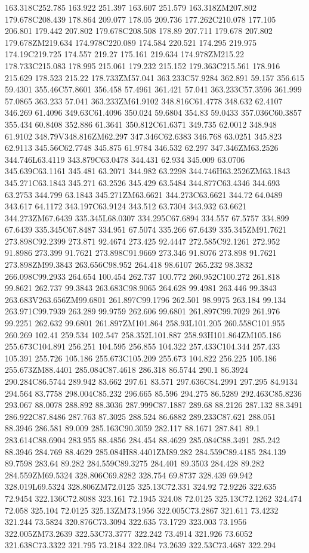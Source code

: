 163.318C252.785 163.922 251.397 163.607 251.579 163.318ZM207.802 179.678C208.439 178.864 209.077 178.05 209.736 177.262C210.078 177.105 206.801 179.442 207.802 179.678C208.508 178.89 207.711 179.678 207.802 179.678ZM219.634 174.978C220.089 174.584 220.521 174.295 219.975 174.19C219.725 174.557 219.27 175.161 219.634 174.978ZM215.22 178.733C215.083 178.995 215.061 179.232 215.152 179.363C215.561 178.916 215.629 178.523 215.22 178.733ZM57.041 363.233C57.9284 362.891 59.157 356.615 59.4301 355.46C57.8601 356.458 57.4961 361.421 57.041 363.233C57.3596 361.999 57.0865 363.233 57.041 363.233ZM61.9102 348.816C61.4778 348.632 62.4107 346.269 61.4096 349.63C61.4096 350.024 59.6804 354.83 59.0433 357.036C60.3857 355.434 60.8408 352.886 61.3641 350.812C61.6371 349.735 62.0012 348.948 61.9102 348.79V348.816ZM62.297 347.346C62.6383 346.768 63.0251 345.823 62.9113 345.56C62.7748 345.875 61.9784 346.532 62.297 347.346ZM63.2526 344.746L63.4119 343.879C63.0478 344.431 62.934 345.009 63.0706 345.639C63.1161 345.481 63.2071 344.982 63.2298 344.746H63.2526ZM63.1843 345.271C63.1843 345.271 63.2526 345.429 63.5484 344.877C63.4346 344.693 63.2753 344.799 63.1843 345.271ZM63.6621 344.273C63.6621 344.72 64.0489 343.617 64.1172 343.197C63.9124 343.512 63.7304 343.932 63.6621 344.273ZM67.6439 335.345L68.0307 334.295C67.6894 334.557 67.5757 334.899 67.6439 335.345C67.8487 334.951 67.5074 335.266 67.6439 335.345ZM91.7621 273.898C92.2399 273.871 92.4674 273.425 92.4447 272.585C92.1261 272.952 91.8986 273.399 91.7621 273.898C91.9669 273.346 91.8076 273.898 91.7621 273.898ZM99.3843 263.656C98.952 264.418 98.6107 265.232 98.3832 266.098C99.2933 264.654 100.454 262.737 100.772 260.952C100.272 261.818 99.8621 262.737 99.3843 263.683C98.9065 264.628 99.4981 263.446 99.3843 263.683V263.656ZM99.6801 261.897C99.1796 262.501 98.9975 263.184 99.134 263.971C99.7939 263.289 99.9759 262.606 99.6801 261.897C99.7029 261.976 99.2251 262.632 99.6801 261.897ZM101.864 258.93L101.205 260.558C101.955 260.269 102.41 259.534 102.547 258.352L101.887 258.93H101.864ZM105.186 255.673C104.891 256.251 104.595 256.855 104.322 257.433C104.344 257.433 105.391 255.726 105.186 255.673C105.209 255.673 104.822 256.225 105.186 255.673ZM88.4401 285.084C87.4618 286.318 86.5744 290.1 86.3924 290.284C86.5744 289.942 83.662 297.61 83.571 297.636C84.2991 297.295 84.9134 294.564 83.7758 298.004C85.232 296.665 85.596 294.275 86.5289 292.463C85.8236 293.067 88.0078 288.892 88.3036 287.999C87.1887 289.68 88.2126 287.132 88.3491 286.922C87.8486 287.763 87.3025 288.524 86.6882 289.233C87.621 288.051 88.3946 286.581 89.009 285.163C90.3059 282.117 88.1671 287.841 89.1 283.614C88.6904 283.955 88.4856 284.454 88.4629 285.084C88.3491 285.242 88.3946 284.769 88.4629 285.084H88.4401ZM89.282 284.559C89.4185 284.139 89.7598 283.64 89.282 284.559C89.3275 284.401 89.3503 284.428 89.282 284.559ZM69.5324 328.806C69.8282 328.754 69.8737 328.439 69.942 328.019L69.5324 328.806ZM72.0125 325.13C72.331 324.92 72.9226 322.635 72.9454 322.136C72.8088 323.161 72.1945 324.08 72.0125 325.13C72.1262 324.474 72.058 325.104 72.0125 325.13ZM73.1956 322.005C73.2867 321.611 73.4232 321.244 73.5824 320.876C73.3094 322.635 73.1729 323.003 73.1956 322.005ZM73.2639 322.53C73.3777 322.242 73.4914 321.926 73.6052 321.638C73.3322 321.795 73.2184 322.084 73.2639 322.53C73.4687 322.294 